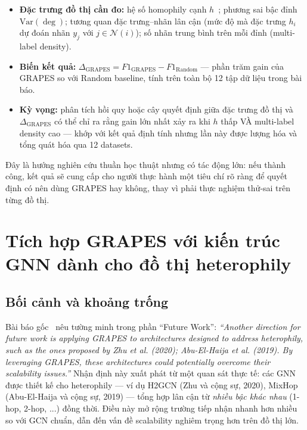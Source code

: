 \begin{itemize}
    \item \textbf{Đặc trưng đồ thị cần đo:} hệ số homophily cạnh $h$~\cite{Younesian2023GRAPES}; phương sai bậc đỉnh $\mathrm{Var}(\deg)$; tương quan đặc trưng--nhãn lân cận (mức độ mà đặc trưng $h_i$ dự đoán nhãn $y_j$ với $j \in \mathcal{N}(i)$); số nhãn trung bình trên mỗi đỉnh (multi-label density).
    \item \textbf{Biến kết quả:} $\Delta_{\mathrm{GRAPES}} = F1_{\mathrm{GRAPES}} - F1_{\mathrm{Random}}$ --- phần trăm gain của GRAPES so với Random baseline, tính trên toàn bộ 12 tập dữ liệu trong bài báo.
    \item \textbf{Kỳ vọng:} phân tích hồi quy hoặc cây quyết định giữa đặc trưng đồ thị và $\Delta_{\mathrm{GRAPES}}$ có thể chỉ ra rằng gain lớn nhất xảy ra khi $h$ thấp VÀ multi-label density cao --- khớp với kết quả định tính nhưng lần này được lượng hóa và tổng quát hóa qua 12 datasets.
\end{itemize}

Đây là hướng nghiên cứu thuần học thuật nhưng có tác động lớn: nếu thành công, kết quả sẽ cung cấp cho người thực hành một tiêu chí rõ ràng để quyết định có nên dùng GRAPES hay không, thay vì phải thực nghiệm thử-sai trên từng đồ thị.

\section{Tích hợp GRAPES với kiến trúc GNN dành cho đồ thị heterophily}
\label{sec:hetero_arch}

\subsection{Bối cảnh và khoảng trống}

Bài báo gốc~\cite{Younesian2023GRAPES} nêu tường minh trong phần ``Future Work'': \textit{``Another direction for future work is applying GRAPES to architectures designed to address heterophily, such as the ones proposed by Zhu et al. (2020); Abu-El-Haija et al. (2019). By leveraging GRAPES, these architectures could potentially overcome their scalability issues.''} Nhận định này xuất phát từ một quan sát thực tế: các GNN được thiết kế cho heterophily --- ví dụ H2GCN (Zhu và cộng sự, 2020), MixHop (Abu-El-Haija và cộng sự, 2019) --- tổng hợp lân cận từ \textit{nhiều bậc khác nhau} (1-hop, 2-hop, ...) đồng thời. Điều này mở rộng trường tiếp nhận nhanh hơn nhiều so với GCN chuẩn, dẫn đến vấn đề scalability nghiêm trọng hơn trên đồ thị lớn.

